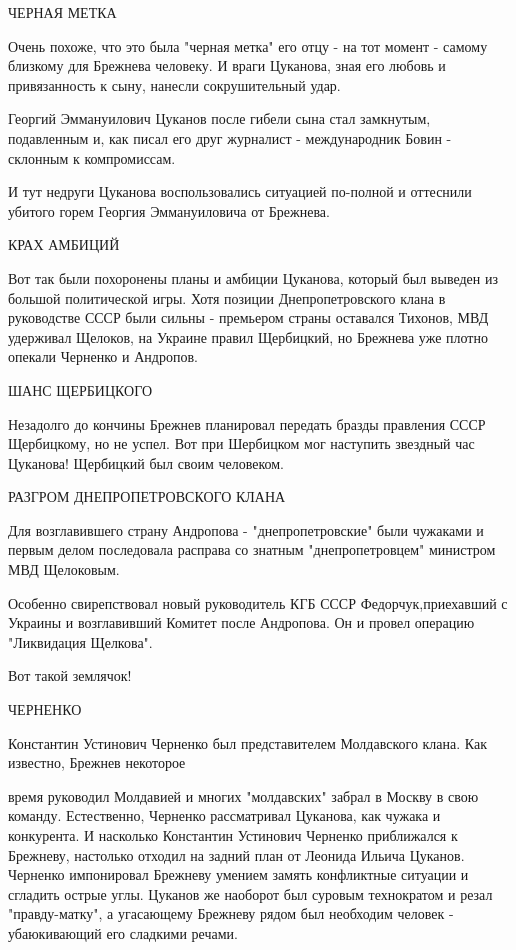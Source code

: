 ЧЕРНАЯ МЕТКА

Очень похоже, что это была "черная метка" его отцу - на тот момент - самому
близкому для Брежнева человеку. И враги Цуканова, зная его любовь и
привязанность к сыну, нанесли сокрушительный удар.

Георгий Эммануилович Цуканов после гибели сына стал замкнутым, подавленным и,
как писал его друг журналист - международник Бовин - склонным к компромиссам.

И тут недруги Цуканова воспользовались ситуацией по-полной и оттеснили убитого
горем Георгия Эммануиловича от Брежнева.

КРАХ АМБИЦИЙ

Вот так были похоронены планы и амбиции Цуканова, который был выведен из
большой политической игры. Хотя позиции Днепропетровского клана в руководстве
СССР были сильны - премьером страны оставался Тихонов, МВД удерживал Щелоков,
на Украине правил Щербицкий, но Брежнева уже плотно опекали Черненко и
Андропов.

ШАНС ЩЕРБИЦКОГО

Незадолго до кончины Брежнев планировал передать бразды правления СССР
Щербицкому, но не успел. Вот при Шербицком мог наступить звездный час Цуканова!
Щербицкий был своим человеком.

РАЗГРОМ ДНЕПРОПЕТРОВСКОГО КЛАНА

Для возглавившего страну Андропова - "днепропетровские" были чужаками и первым
делом последовала расправа со знатным "днепропетровцем" министром МВД
Щелоковым.

Особенно свирепствовал новый руководитель КГБ СССР Федорчук,приехавший с
Украины и возглавивший Комитет после Андропова. Он и провел операцию
"Ликвидация Щелкова".

Вот такой землячок!

ЧЕРНЕНКО

Константин Устинович Черненко был представителем Молдавского клана. Как
известно, Брежнев некоторое

время руководил Молдавией и многих "молдавских" забрал в Москву в свою команду.
Естественно, Черненко рассматривал Цуканова, как чужака и конкурента. И
насколько Константин Устинович Черненко приближался к Брежневу, настолько
отходил на задний план от Леонида Ильича Цуканов. Черненко импонировал Брежневу
умением замять конфликтные ситуации и сгладить острые углы. Цуканов же наоборот
был суровым технократом и резал "правду-матку", а угасающему Брежневу рядом был
необходим человек - убаюкивающий его сладкими речами.

